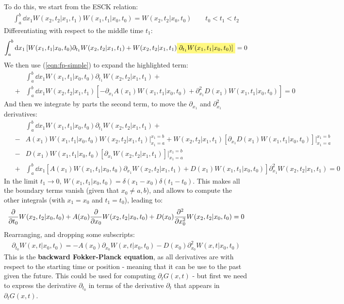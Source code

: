 \documentclass[../template.tex]{subfiles}
\begin{document}
To do this, we start from the ESCK relation:
\begin{align*}
    \int_a^b \dd{x_1} W(x_2, t_2|x_1,t_1) W(x_1,t_1 | x_0,t_0) = W(x_2, t_2 | x_0, t_0) \qquad t_0 < t_1 < t_2
\end{align*}
Differentiating with respect to the middle time $t_1$:
\begin{align*}
    \int_a^b \dd{x_1} [W(x_1,t_1|x_0,t_0)\partial_{t_1} W(x_2,t_2|x_1,t_1) + W(x_2,t_2|x_1,t_1)\hlc{Yellow}{ \partial_{t_1} W(x_1,t_1|x_0,t_0)]} = 0
\end{align*}
We then use (\ref{eqn:fp-simple}) to expand the highlighted term:
\begin{align*}
    &\int_a^b \dd{x_1} W(x_1,t_1|x_0,t_0)\partial_{t_1} W(x_2,t_2|x_1,t_1)+\\ \quad \>+&\int_a^b \dd{x_1} W(x_2,t_2|x_1,t_1)[-\partial_{x_1} A(x_1) W(x_1,t_1|x_0,t_0) + \partial_{x_1}^2 D(x_1)W(x_1,t_1|x_0,t_0)] = 0
\end{align*}
And then we integrate by parts the second term, to move the $\partial_{x_1}$ and $\partial_{x_1}^2$ derivatives:
\begin{align*}
    &\int_a^b \dd{x_1} W(x_1,t_1|x_0,t_0)\partial_{t_1} W(x_2,t_2|x_1,t_1)+\\
\quad \> - & A(x_1) W(x_1,t_1|x_0,t_0) W(x_2,t_2|x_1,t_1)\Big|_{x_1=a}^{x_1 = b} +W(x_2,t_2|x_1,t_1) [\partial_{x_1} D(x_1) W(x_1,t_1|x_0,t_0)] \Big|_{x_1=a}^{x_1=b}\\
\quad \> - &D(x_1)W(x_1,t_1|x_0,t_0)[\partial_{x_1} W(x_2,t_2|x_1,t_1)] \Big|_{x_1=a}^{x_1=b} \\
\quad \>+ &\int_a^b \dd{x_1} [A(x_1) W(x_1,t_1|x_0,t_0)\partial_{x_1} W(x_2,t_2|x_1,t_1) + D(x_1) W(x_1,t_1|x_0,t_0)] \partial_{x_1}^2 W(x_2,t_2|x_1,t_1) = 0
\end{align*}
In the limit $t_1 \to 0$, $W(x_1,t_1|x_0,t_0) = \delta(x_1- x_0) \delta(t_1-t_0)$. This makes all the boundary terms vanish (given that $x_0 \neq a,b$), and allows to compute the other integrals (with $x_1 = x_0$ and $t_1=t_0$), leading to:
\begin{align*}
    \pdv{t_0} W(x_2,t_2|x_0,t_0) + A(x_0) \pdv{x_0} W(x_2,t_2|x_0,t_0) + D(x_0) \pdv[2]{x_0} W(x_2,t_2|x_0,t_0) = 0
\end{align*}
Rearranging, and dropping some subscripts:
\begin{align}
    \partial_{t_0} W(x,t|x_0,t_0) = -A(x_0) \partial_{x_0} W(x,t|x_0,t_0) - D(x_0) \partial_{x_0}^2 W(x,t|x_0,t_0) \label{eqn:backward-fp}
\end{align}
This is the \textbf{backward Fokker-Planck equation}, as all derivatives are with respect to the starting time or position - meaning that it can be use to  the past given the future. This could be used for computing $\partial_t G(x,t)$ - but first we need to express the derivative $\partial_{t_0}$ in terms of the derivative $\partial_t$ that appears in $\partial_t G(x,t)$.  
\end{document}
